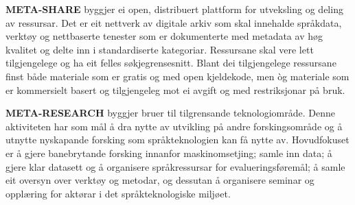 \begin{multicols}{2}
\textbf{META-SHARE} byggjer ei open, distribuert plattform for utveksling og deling av ressursar. Det er eit nettverk av digitale arkiv som skal innehalde språkdata, verktøy og nettbaserte tenester som er dokumenterte med metadata av høg kvalitet og delte inn i standardiserte kategoriar. Ressursane skal vere lett tilgjengelege og ha eit felles søkjegrensesnitt. Blant dei tilgjengelege ressursane finst både materiale som er gratis og med open kjeldekode, men òg materiale som er kommersielt basert og tilgjengeleg mot ei avgift og med restriksjonar på bruk. 

\textbf{META-RESEARCH} byggjer bruer til tilgrensande teknologiområde. Denne aktiviteten har som mål å dra nytte av utvikling på andre forskingsområde og å utnytte nyskapande forsking som språkteknologien kan få nytte av. Hovudfokuset er å gjere banebrytande forsking innanfor maskinomsetjing; samle inn data; å gjere klar datasett og å organisere språkressursar for evalueringsføremål; å samle eit oversyn over verktøy og metodar, og dessutan å organisere seminar og opplæring for aktørar i det språkteknologiske miljøet. 
\end{multicols}
